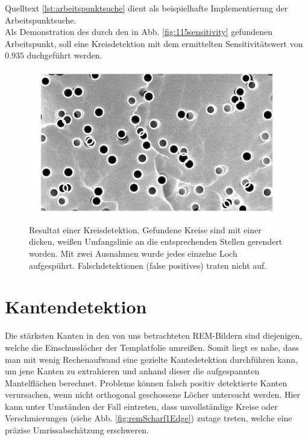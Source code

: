 \documentclass[accentcolor=tud1c, 11pt, toc=bib, toc=listof, captions=abovetable, parskip=half]{tudreport}
\begin{document}
Quelltext \ref{lst:arbeitspunktsuche} dient als beispielhafte Implementierung der Arbeitspunktsuche.\\



Als Demonstration des durch den in Abb. \ref{fig:115sensitivity} gefundenen Arbeitspunkt, soll eine Kreisdetektion mit dem ermittelten Sensitivitätswert von $0.935$ duchgeführt werden.\\ %

\begin{figure}
	\centering
    \includegraphics[scale=0.8]{Figures/115edgesWhite.png}
    \caption{Resultat einer Kreisdetektion. Gefundene Kreise sind mit einer dicken, weißen Umfangslinie an die entsprechenden Stellen gerendert worden. Mit zwei Ausnahmen wurde jedes einzelne Loch aufgespührt. Falschdetektionen (false positives) traten nicht auf.}
    \label{fig:edgesWhite}
\end{figure}

\section{Kantendetektion}
\label{ch:kantendetektion}
Die stärksten Kanten in den von uns betrachteten REM-Bildern sind diejenigen, welche die Einschusslöcher der Templatfolie umreißen. Somit liegt es nahe, dass man mit wenig Rechenaufwand eine gezielte Kantedetektion durchführen kann, um jene Kanten zu extrahieren und anhand dieser die aufgespannten Mantelflächen berechnet. 
Probleme können falsch positiv detektierte Kanten verursachen, wenn nicht orthogonal geschossene Löcher untersucht werden. Hier kann unter Umständen der Fall eintreten, dass unvollständige Kreise oder Verschmierungen (siehe Abb. \ref{fig:remScharf1Edge}) zutage treten, welche eine präzise Umrissabschätzung erschweren.
\end{document}
